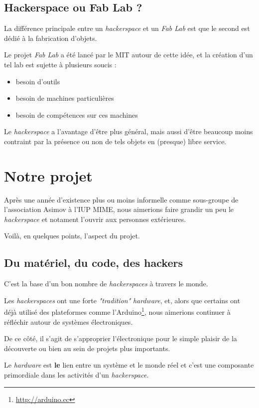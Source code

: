 \documentclass[a4paper, 11pt]{report}
\newcommand{\hs}{{\itshape hackerspace}}
\newcommand{\hsss}{{\itshape hackerspaces}}
\newcommand{\hw}{{\itshape hardware}}
\begin{document}
    \subsection{Hackerspace ou Fab Lab ?}

    La différence principale entre un \hs{} et un {\itshape Fab Lab} est que le second est dédié à la fabrication d'objets.

Le projet {\itshape Fab Lab} a été lancé par le MIT autour de cette idée, et la création d'un tel lab est sujette à plusieurs
soucis :

\begin{itemize}
    \item besoin d'outils
    \item besoin de machines particulières
    \item besoin de compétences sur ces machines
\end{itemize}

Le \hs{} a l'avantage d'être plus général, mais aussi d'être beaucoup moins contraint par la présence ou non de tels objets en
(presque) libre service.

    \section{Notre projet}

Après une année d'existence plus ou moins informelle comme sous-groupe de l'association Asimov à l'IUP MIME, nous
aimerions faire grandir un peu le \hs{} et notament l'ouvrir aux personnes extérieures.

Voilà, en quelques points, l'aspect du projet.

    \subsection{Du matériel, du code, des hackers}

C'est la base d'un bon nombre de \hsss{} à travers le monde.

Les \hsss{} ont une forte {\it "tradition"} \hw, et, alors que certains ont déjà utilisé des plateformes comme
l'Arduino\footnote{\url{http://arduino.cc}}, nous aimerions continuer à réfléchir autour de systèmes électroniques.

De ce côté, il s'agit de s'approprier l'électronique pour le simple plaisir de la découverte ou bien au sein de projets
plus importants.

\medskip

Le \hw{} est {\bf le} lien entre un système et le monde réel et c'est une composante primordiale dans les activités d'un
\hs.
\end{document}
